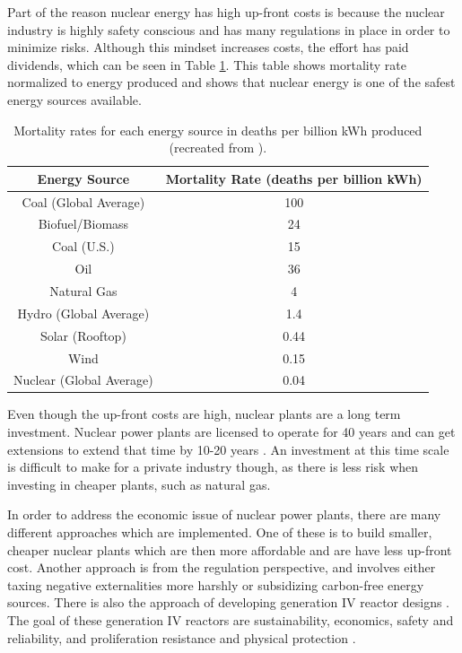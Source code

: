 Part of the reason nuclear energy has high up-front costs is because the nuclear industry is highly safety conscious and has many regulations in place in order to minimize risks.
Although this mindset increases costs, the effort has paid dividends, which can be seen in Table \ref{tab:death-mega}. This table shows mortality rate normalized to energy produced and shows that nuclear energy is one of the safest energy sources available.

\begin{table}[H]
\renewcommand{\arraystretch}{1.25}
\caption{Mortality rates for each energy source in deaths per billion kWh produced (recreated from \cite{brook_why_2014}).}
\label{tab:death-mega}
\begin{center}
\begin{tabular}{ | c | c | }
 \hline
 Energy Source & Mortality Rate (deaths per billion kWh)\\
 \hline
 \hline
 Coal (Global Average) & 100 \\
 Biofuel/Biomass & 24 \\
 Coal (U.S.) & 15 \\
 Oil & 36 \\
 Natural Gas & 4 \\
 Hydro (Global Average) & 1.4 \\
 Solar (Rooftop) & 0.44 \\
 Wind & 0.15 \\
 Nuclear (Global Average) & 0.04 \\
 
 \hline
\end{tabular}
\end{center}
\end{table}

Even though the up-front costs are high, nuclear plants are a long term investment. Nuclear power plants are licensed to operate for 40 years and can get extensions to extend that time by 10-20 years \cite{bredimas_international_2008}.
An investment at this time scale is difficult to make for a private industry though, as there is less risk when investing in cheaper plants, such as natural gas. 

In order to address the economic issue of nuclear power plants, there are many different approaches which are implemented. One of these is to build smaller, cheaper nuclear plants which are then more affordable and are have less up-front cost. Another approach is from the regulation perspective, and involves either taxing negative externalities more harshly or subsidizing carbon-free energy sources. There is also the approach of developing generation IV reactor designs \cite{kelly_generation_2014}. The goal of these generation IV reactors are sustainability, economics, safety and reliability, and proliferation resistance and physical protection \cite{kelly_generation_2014}.

